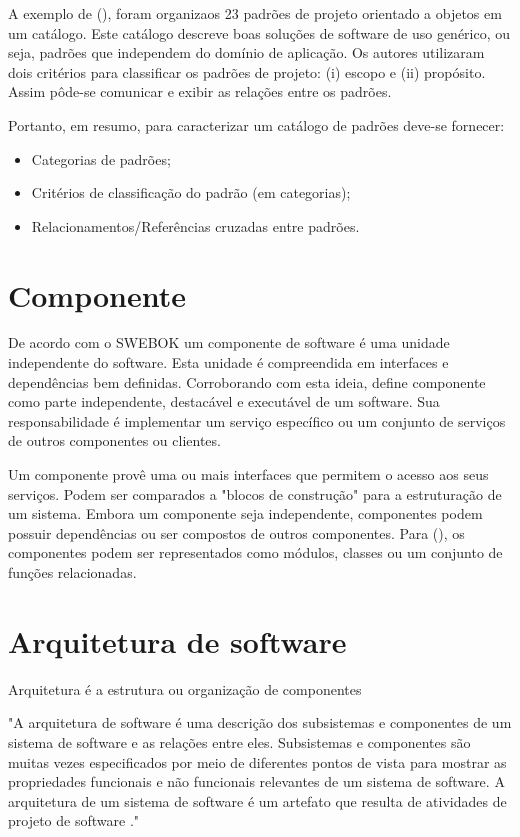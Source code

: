 A exemplo de \citeauthor{gamma1995} (\citeyear{gamma1995}), foram organizaos 23 padrões de projeto orientado a objetos em um catálogo. Este catálogo descreve boas soluções de software de uso genérico, ou seja, padrões que independem do domínio de aplicação. Os autores utilizaram dois critérios para classificar os padrões de projeto: (i) escopo e (ii) propósito. Assim pôde-se comunicar e exibir as relações entre os padrões.

Portanto, em resumo, para caracterizar um catálogo de padrões deve-se fornecer:

\begin{itemize}
    \item Categorias de padrões;
    \item Critérios de classificação do padrão (em categorias);
    \item Relacionamentos/Referências cruzadas entre padrões.
\end{itemize}

\section{Componente}



De acordo com o SWEBOK \cite{swebok} um componente de software é uma unidade independente do software. Esta unidade é compreendida em interfaces e dependências bem definidas. Corroborando com esta ideia, \citeauthor{buschmann2007} define componente como parte independente, destacável e executável de um software. Sua responsabilidade é implementar um serviço específico ou um conjunto de serviços de outros componentes ou clientes. 

Um componente provê uma ou mais interfaces que permitem o acesso aos seus serviços. Podem ser comparados a "blocos de construção" para a estruturação de um sistema. Embora um componente seja independente, componentes podem possuir dependências ou ser compostos de outros componentes. Para \citeauthor{buschmann2007} (\citeyear{buschmann2007}), os componentes podem ser representados como módulos, classes ou um conjunto de funções relacionadas. 

\section{Arquitetura de software}

Arquitetura é a estrutura ou organização de componentes 

\begin{citacao}
"A arquitetura de software é uma descrição dos subsistemas e componentes de um sistema de software e as relações entre eles. Subsistemas e componentes são muitas vezes especificados por meio de diferentes pontos de vista para mostrar as propriedades funcionais e não funcionais relevantes de um sistema de software. A arquitetura de um sistema de software é um artefato que resulta de atividades de projeto de software \cite{buschmann2007}."
\end{citacao}

